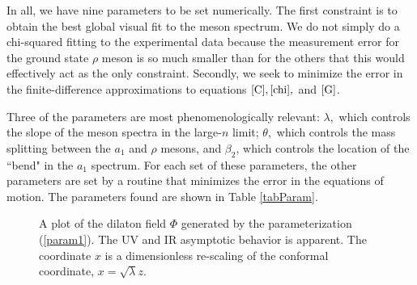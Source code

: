 \documentclass[aps,prd,12pt,nofootinbib]{revtex4}
\begin{document}
In all, we have nine parameters to be set numerically. 
The first constraint is to obtain the best global visual fit to the meson spectrum. 
We do not simply do a chi-squared fitting to the experimental data because the measurement error for the ground state $\rho$ meson is so much smaller than for the others that this would effectively act as the only constraint. 
Secondly, we seek to minimize the error in the finite-difference approximations to equations $\ref{C}, \ref{chi},$ and $\ref{G}$. 

Three of the parameters are most phenomenologically relevant: $\lambda,$ which controls the slope of the meson spectra in the large-$n$ limit; $\theta,$ which controls the mass splitting between the $a_1$ and $\rho$ mesons, and $\beta_2$, which controls the location of the ``bend" in the $a_1$ spectrum.
For each set of these parameters, the other parameters are set by a routine that minimizes the error in the equations of motion. 
The parameters found are shown in Table \ref{tabParam}.

\begin{figure}[htb]
\caption{A plot of the dilaton field $\Phi$ generated by the parameterization (\ref{param1}).
The UV and IR asymptotic behavior is apparent.
The coordinate $x$ is a dimensionless re-scaling of the conformal coordinate, $x=\sqrt{\lambda}z$.}
\label{figDilaton}
\end{figure}
\end{document}
